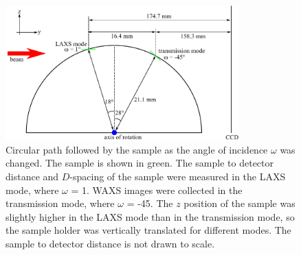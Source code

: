 \begin{figure}[htbp]
  \centering
  \includegraphics[width=0.8\textwidth]{figures/ripple/MMs/transmission/sgeometry}
  \caption[Circular path followed by the sample as the angle of incidence $\omega$ was changed]
  {Circular path followed by the sample as the angle of incidence $\omega$ was changed.
  The sample is shown in green. 
  The sample to detector distance and $D$-spacing of the sample were measured in the LAXS mode, 
  where $\omega$ = 1\textdegree. WAXS images were collected in the transmission mode, 
  where $\omega$ = -45\textdegree. The $z$ position of the sample was
  slightly higher in the LAXS mode than in the transmission mode, so the 
  sample holder was vertically translated for different modes.
  The sample to detector distance is not drawn to scale.}
  \label{fig:sgeometry}
\end{figure}
\newpage
